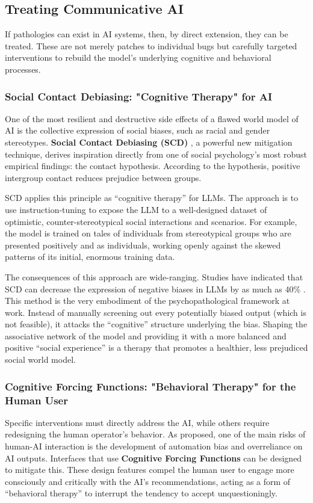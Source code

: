 \documentclass{article}
\begin{document}
\clearpage

\subsection{Treating Communicative AI}
If pathologies can exist in AI systems, then, by direct extension, they can be treated. These are not merely patches to individual bugs but carefully targeted interventions to rebuild the model's underlying cognitive and behavioral processes.

\subsubsection{Social Contact Debiasing: "Cognitive Therapy" for AI}
One of the most resilient and destructive side effects of a flawed world model of AI is the collective expression of social biases, such as racial and gender stereotypes. \textbf{Social Contact Debiasing (SCD)} \citep{ref33}, a powerful new mitigation technique, derives inspiration directly from one of social psychology's most robust empirical findings: the contact hypothesis. According to the hypothesis, positive intergroup contact reduces prejudice between groups.

SCD applies this principle as “cognitive therapy” for LLMs. The approach is to use instruction-tuning to expose the LLM to a well-designed dataset of optimistic, counter-stereotypical social interactions and scenarios. For example, the model is trained on tales of individuals from stereotypical groups who are presented positively and as individuals, working openly against the skewed patterns of its initial, enormous training data.

The consequences of this approach are wide-ranging. Studies have indicated that SCD can decrease the expression of negative biases in LLMs by as much as 40\% \citep{ref33}. This method is the very embodiment of the psychopathological framework at work. Instead of manually screening out every potentially biased output (which is not feasible), it attacks the “cognitive” structure underlying the bias. Shaping the associative network of the model and providing it with a more balanced and positive “social experience” is a therapy that promotes a healthier, less prejudiced social world model.

\subsubsection{Cognitive Forcing Functions: "Behavioral Therapy" for the Human User}
Specific interventions must directly address the AI, while others require redesigning the human operator's behavior. As proposed, one of the main risks of human-AI interaction is the development of automation bias and overreliance on AI outputs. Interfaces that use \textbf{Cognitive Forcing Functions} can be designed to mitigate this. These design features compel the human user to engage more consciously and critically with the AI's recommendations, acting as a form of “behavioral therapy” to interrupt the tendency to accept unquestioningly.
\end{document}

